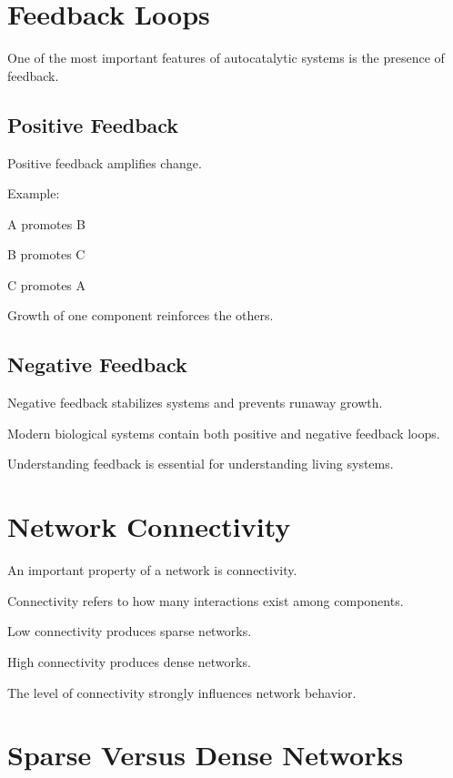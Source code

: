 \documentclass[
  oneside,
  openany]{book}
\begin{document}
\section{Feedback Loops}\label{feedback-loops}

One of the most important features of autocatalytic systems is the presence of feedback.

\subsection{Positive Feedback}\label{positive-feedback}

Positive feedback amplifies change.

Example:

A promotes B

B promotes C

C promotes A

Growth of one component reinforces the others.

\subsection{Negative Feedback}\label{negative-feedback}

Negative feedback stabilizes systems and prevents runaway growth.

Modern biological systems contain both positive and negative feedback loops.

Understanding feedback is essential for understanding living systems.

\section{Network Connectivity}\label{network-connectivity}

An important property of a network is connectivity.

Connectivity refers to how many interactions exist among components.

Low connectivity produces sparse networks.

High connectivity produces dense networks.

The level of connectivity strongly influences network behavior.

\section{Sparse Versus Dense Networks}\label{sparse-versus-dense-networks}
\end{document}
